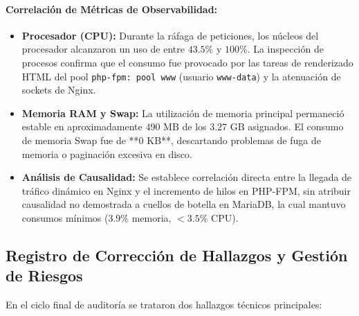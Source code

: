 \documentclass[12pt,a4paper]{article}
\begin{document}
\paragraph{Correlación de Métricas de Observabilidad:}
\begin{itemize}[leftmargin=1.5em]
    \item \textbf{Procesador (CPU):} Durante la ráfaga de peticiones, los núcleos del procesador alcanzaron un uso de entre $43.5\%$ y $100\%$. La inspección de procesos confirma que el consumo fue provocado por las tareas de renderizado HTML del pool \texttt{php-fpm: pool www} (usuario \texttt{www-data}) y la atenuación de sockets de Nginx.
    \item \textbf{Memoria RAM y Swap:} La utilización de memoria principal permaneció estable en aproximadamente $490\text{ MB}$ de los $3.27\text{ GB}$ asignados. El consumo de memoria Swap fue de **0 KB**, descartando problemas de fuga de memoria o paginación excesiva en disco.
    \item \textbf{Análisis de Causalidad:} Se establece correlación directa entre la llegada de tráfico dinámico en Nginx y el incremento de hilos en PHP-FPM, sin atribuir causalidad no demostrada a cuellos de botella en MariaDB, la cual mantuvo consumos mínimos ($3.9\%$ memoria, $<3.5\%$ CPU).
\end{itemize}

\subsection{Registro de Corrección de Hallazgos y Gestión de Riesgos}
En el ciclo final de auditoría se trataron dos hallazgos técnicos principales:
\end{document}
